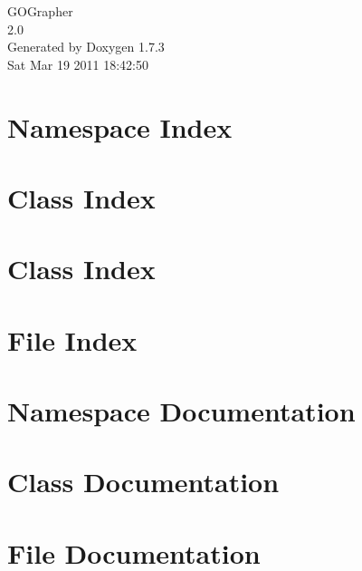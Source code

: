 \documentclass[a4paper]{book}
\begin{document}
\hypersetup{pageanchor=false}
\begin{titlepage}
\vspace*{7cm}
\begin{center}
{\Large GOGrapher \\[1ex]\large 2.0 }\\
\vspace*{1cm}
{\large Generated by Doxygen 1.7.3}\\
\vspace*{0.5cm}
{\small Sat Mar 19 2011 18:42:50}\\
\end{center}
\end{titlepage}
\clearemptydoublepage
{}
\tableofcontents
\clearemptydoublepage
{}
\hypersetup{pageanchor=true}
\chapter{Namespace Index}

\chapter{Class Index}

\chapter{Class Index}

\chapter{File Index}

\chapter{Namespace Documentation}







\chapter{Class Documentation}






\chapter{File Documentation}







\printindex
\end{document}
